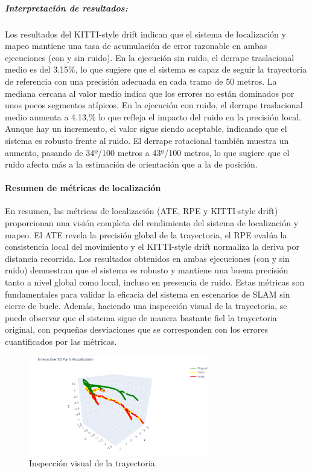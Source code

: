 \documentclass[12pt, a4paper, twoside]{article}
\begin{document}
\subparagraph{Interpretación de resultados:}
Los resultados del KITTI-style drift\cite{Geiger2013KITTI} indican que el sistema de localización y mapeo mantiene
una tasa de acumulación de error razonable en ambas ejecuciones (con y sin ruido).
En la ejecución sin ruido, el derrape traslacional medio es del 3.15\%, lo que sugiere que el sistema es capaz de seguir la trayectoria de referencia con una
precisión adecuada en cada tramo de 50 metros. La mediana cercana al valor medio indica
que los errores no están dominados por unos pocos segmentos atípicos.\newline
En la ejecución con ruido, el derrape traslacional medio aumenta a 4.13,\% lo que refleja el impacto del ruido en la precisión local.
Aunque hay un incremento, el valor sigue siendo aceptable, indicando que el sistema es robusto frente al ruido.
El derrape rotacional también muestra un aumento, pasando de 34º/100 metros a 43º/100 metros, lo que sugiere que el ruido afecta más a la estimación de orientación que
a la de posición.\newline

\paragraph{Resumen de métricas de localización}
En resumen, las métricas de localización (ATE, RPE y KITTI-style drift\cite{Geiger2013KITTI}) proporcionan una visión completa del rendimiento del sistema de localización y mapeo.
El ATE\cite{Chen2022DELOATE} revela la precisión global de la trayectoria, el RPE\cite{Sturm2012RPE} evalúa la consistencia local del movimiento y el KITTI-style drift\cite{Geiger2013KITTI} normaliza la deriva por distancia recorrida.
Los resultados obtenidos en ambas ejecuciones (con y sin ruido) demuestran que el sistema es robusto y mantiene una buena precisión tanto a nivel global como local, incluso en presencia de ruido.
Estas métricas son fundamentales para validar la eficacia del sistema en escenarios de SLAM\cite{smith1987slam} sin cierre de bucle. Además, haciendo una inspección visual de la trayectoria, se puede observar que el sistema sigue de manera bastante fiel la trayectoria original,
con pequeñas desviaciones que se corresponden con los errores cuantificados por las métricas.

\begin{figure}[h]
  \centering
    \includegraphics[width=0.7\textwidth]{full_path.png}
  \caption{Inspección visual de la trayectoria.}
\end{figure} 
\end{document}
